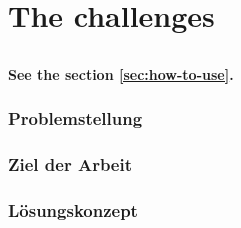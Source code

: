 \part{The challenges}
\chapter{}
\label{sec:Introduction}

\textbf{See the section \ref{sec:how-to-use}.}

\section{Problemstellung}
\section{Ziel der Arbeit}
\section{Lösungskonzept}
